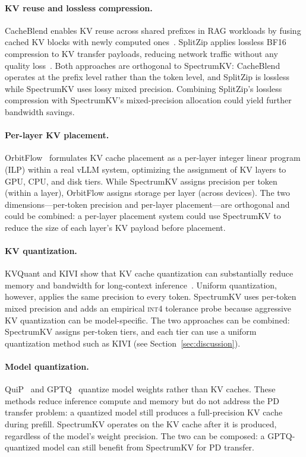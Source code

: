 \documentclass[11pt]{article}
\newcommand{\method}{SpectrumKV}
\newcommand{\intiv}{\textsc{int4}}
\theoremstyle{plain}
\theoremstyle{definition}
\begin{document}
\paragraph{KV reuse and lossless compression.}
CacheBlend enables KV reuse across shared prefixes in RAG workloads by fusing cached KV blocks with newly computed ones~\citep{cacheblend}.  SplitZip applies lossless BF16 compression to KV transfer payloads, reducing network traffic without any quality loss~\citep{splitzip}.  Both approaches are orthogonal to \method{}: CacheBlend operates at the prefix level rather than the token level, and SplitZip is lossless while \method{} uses lossy mixed precision.  Combining SplitZip's lossless compression with \method{}'s mixed-precision allocation could yield further bandwidth savings.

\paragraph{Per-layer KV placement.}
OrbitFlow~\citep{orbitflow} formulates KV cache placement as a per-layer integer linear program (ILP) within a real vLLM system, optimizing the assignment of KV layers to GPU, CPU, and disk tiers.  While \method{} assigns precision per token (within a layer), OrbitFlow assigns storage per layer (across devices).  The two dimensions---per-token precision and per-layer placement---are orthogonal and could be combined: a per-layer placement system could use \method{} to reduce the size of each layer's KV payload before placement.

\paragraph{KV quantization.}
KVQuant and KIVI show that KV cache quantization can substantially reduce memory and bandwidth for long-context inference~\citep{kvquant,kivi}.  Uniform quantization, however, applies the same precision to every token.  \method{} uses per-token mixed precision and adds an empirical \intiv{} tolerance probe because aggressive KV quantization can be model-specific.  The two approaches can be combined: \method{} assigns per-token tiers, and each tier can use a uniform quantization method such as KIVI (see Section~\ref{sec:discussion}).

\paragraph{Model quantization.}
QuiP~\citep{quip} and GPTQ~\citep{gptq} quantize model weights rather than KV caches.  These methods reduce inference compute and memory but do not address the PD transfer problem: a quantized model still produces a full-precision KV cache during prefill.  \method{} operates on the KV cache after it is produced, regardless of the model's weight precision.  The two can be composed: a GPTQ-quantized model can still benefit from \method{} for PD transfer.
\end{document}
